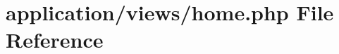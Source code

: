 \hypertarget{views_2home_8php}{\section{application/views/home.php File Reference}
\label{views_2home_8php}
}
